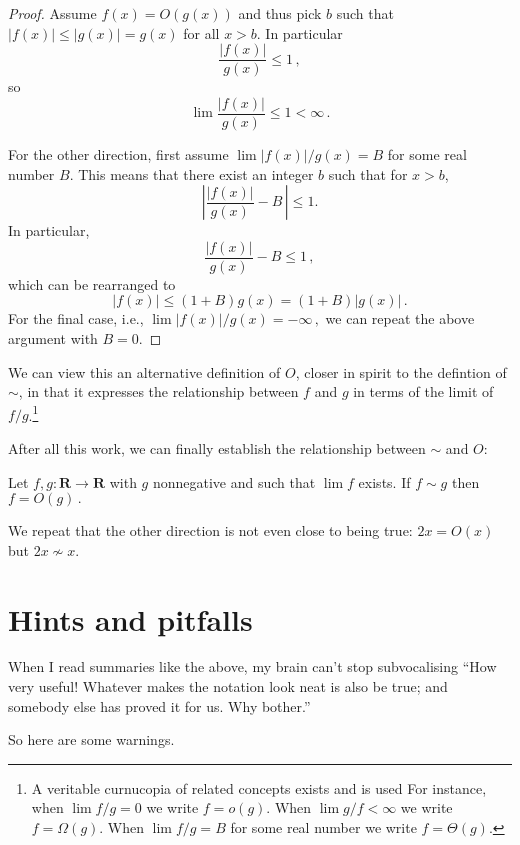 \documentclass{tstextbook}
\begin{document}
\begin{proof}
  Assume $f(x)=O(g(x))$ and thus pick $b$ such that $|f(x)|\leq |g(x)| = g(x)$ for all $x>b$.
  In particular \[\frac{|f(x)|}{g(x)} \leq 1\,,\]
  so \[\lim \frac{|f(x)|}{g(x)} \leq 1< \infty\,.\]
  
  For the other direction, first assume
  \( \lim |f(x)|/ g(x) = B \)
  for some real number $B$.
  This means that there exist an integer $b$ such that for $x>b$,
  \[  \left|\frac{|f(x)|}{g(x)} - B\, \right| \leq 1.\]
  In particular,
  \[ \frac{|f(x)|}{g(x)} - B \leq 1\,,\]
  which can be rearranged to 
  \[ |f(x)| \leq (1+ B)g(x) = (1+B)|g(x)|\,.\]
  For the final case, i.e.,
  \( \lim |f(x)|/ g(x) = -\infty\,, \)
  we can repeat the above argument with $B=0$.
\end{proof}

We can view this an alternative definition of $O$, closer in spirit to the defintion of $\sim$, in that it expresses the relationship between $f$ and $g$ in terms of the limit of $f/g$.\footnote{
  A veritable curnucopia of related concepts exists and is used 
  For instance, when $\lim f/g =0$ we write $f=o(g)$.
  When $\lim g/f < \infty$ we write $f=\Omega(g)$.
  When $\lim f/g = B$ for some real number we write $f=\Theta(g)$.
}

After all this work, we can finally establish the relationship between $\sim$ and $O$:

\begin{theorem}\label{prop: tilde implies Oh}
  Let $f,g\colon\mathbf R\rightarrow\mathbf R$ with $g$ nonnegative and such that $\lim f$ exists.
  If $f\sim g$ then  \( f=O(g)\,. \)
\end{theorem}

We repeat that the other direction is not even close to being true: $2x =O(x)$ but $2x\not\sim x$.

\medskip

\section{Hints and pitfalls}

When I read summaries like the above, my brain can't stop subvocalising ``How very useful! Whatever makes the notation look neat is also be true; and somebody else has proved it for us. Why bother.''

So here are some warnings.
\end{document}
